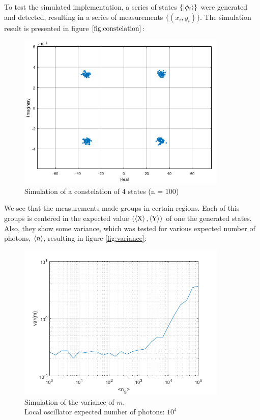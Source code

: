 \begin{bibunit}[plain]
To test the simulated implementation, a series of states $\{\ket{\phi_i}\}$ were generated and detected, resulting in a series of measurements $\{(x_i,y_i)\}$. The simulation result is presented in figure $\ref{fig:constelation}$:
%
\begin{figure}[H]
\centering
\includegraphics[width=10cm]{./sdf/optical_detection/figures/constelation1.png}
\caption{Simulation of a constelation of 4 states (n = 100)}
\label{fig:constelation}
\end{figure}
%
We see that the measurements made groups in certain regions. Each of this groups is centered in the expected value $(\braket{\textrm{X}}, \braket{\textrm{Y}})$ of one the generated states. Also, they show some variance, which was tested for various expected number of photons, $\braket{n}$, resulting in figure \ref{fig:variance}:
%
\begin{figure}[H]
\captionsetup{justification=centering}
\centering
\includegraphics[width=10cm]{./sdf/optical_detection/figures/plot_var_vs_n1.png}
\caption{Simulation of the variance of $m$.\\Local oscillator expected number of photons: $10^4$}

\end{figure}
\end{bibunit}
